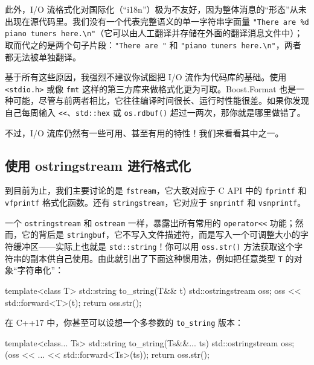 此外，I/O 流格式化对国际化（“i18n”）极为不友好，因为整体消息的“形态”从未出现在源代码里。我们没有一个代表完整语义的单一字符串字面量 \texttt{"There are \%d piano tuners here.\textbackslash n"}（它可以由人工翻译并存储在外面的翻译消息文件中）；取而代之的是两个句子片段：\texttt{"There are "} 和 \texttt{"piano tuners here.\textbackslash n"}，两者都无法被单独翻译。

基于所有这些原因，我强烈不建议你试图把 I/O 流作为代码库的基础。使用 \texttt{<stdio.\allowbreak{}h>\allowbreak{}} 或像 \texttt{fmt} 这样的第三方库来做格式化更为可取。Boost.Format 也是一种可能，尽管与前两者相比，它往往编译时间很长、运行时性能很差。如果你发现自己每周输入 \texttt{<<}、\texttt{std::\allowbreak{}hex} 或 \texttt{os.\allowbreak{}rdbuf(\allowbreak{})\allowbreak{}} 超过一两次，那你就是哪里做错了。

不过，I/O 流库仍然有一些可用、甚至有用的特性！我们来看看其中之一。

\subsection{使用 ostringstream 进行格式化}

到目前为止，我们主要讨论的是 \texttt{fstream}，它大致对应于 C API 中的 \texttt{fprintf} 和 \texttt{vfprintf} 格式化函数。还有 \texttt{stringstream}，它对应于 \texttt{snprintf} 和 \texttt{vsnprintf}。

一个 \texttt{ostringstream} 和 \texttt{ostream} 一样，暴露出所有常用的 \texttt{operator<<} 功能；然而，它的背后是 \texttt{stringbuf}，它不写入文件描述符，而是写入一个可调整大小的字符缓冲区——实际上也就是 \texttt{std::\allowbreak{}string}！你可以用 \texttt{oss.\allowbreak{}str(\allowbreak{})\allowbreak{}} 方法获取这个字符串的副本供自己使用。由此就引出了下面这种惯用法，例如把任意类型 \texttt{T} 的对象“字符串化”：

\begin{codebox}[cpp]
    template<class T>
    std::string to_string(T&& t)
    {
      std::ostringstream oss;
      oss << std::forward<T>(t);
      return oss.str();
    }
\end{codebox}

在 C++17 中，你甚至可以设想一个多参数的 \texttt{to\_\allowbreak{}string} 版本：

\begin{codebox}[cpp]
    template<class... Ts>
    std::string to_string(Ts&&... ts)
    {
      std::ostringstream oss;
      (oss << ... << std::forward<Ts>(ts));
      return oss.str();
    }
\end{codebox}

